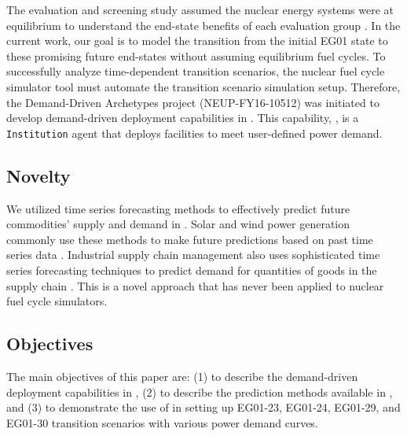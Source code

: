 The evaluation and screening study assumed
the nuclear energy systems were at equilibrium to understand 
the end-state benefits of each evaluation group \cite{feng_standardized_2016}. 
In the current work, our goal is to model the transition from the initial EG01
state to these promising future end-states without assuming equilibrium
fuel cycles. 
To successfully analyze time-dependent transition
scenarios, the nuclear fuel cycle simulator tool must 
automate the transition scenario simulation setup. 
Therefore, the Demand-Driven \Cycamore Archetypes project
(NEUP-FY16-10512) was initiated to develop 
demand-driven deployment capabilities in \Cyclus. 
This capability, \deploy, is a \Cyclus \texttt{Institution}
agent that deploys facilities to meet user-defined power demand. 

\subsection{Novelty}
We utilized time series forecasting methods to effectively predict 
future commodities' supply and demand in \deploy. 
Solar and wind power generation commonly use these methods
to make future predictions based on past time series data
\cite{reikard_predicting_2009,diagne_review_2013,soman_review_2010,taylor_wind_2009}. 
Industrial supply chain management also uses sophisticated time series 
forecasting techniques to predict demand for quantities of goods 
in the supply chain \cite{souza_supply_2014}.
This is a novel approach that has never been applied to 
nuclear fuel cycle simulators. 

\subsection{Objectives}
\label{sec:obj}
The main objectives of this paper are: 
(1) to describe the demand-driven deployment capabilities in 
\Cyclus, 
(2) to describe the prediction methods available in 
\deploy, and
(3) to demonstrate the use of \deploy in setting up 
EG01-23, EG01-24, EG01-29, and EG01-30 transition scenarios 
with various power demand curves.